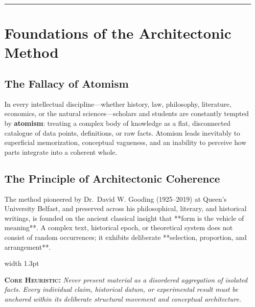 \documentclass[11pt,letterpaper]{article}
\newcommand{\scholion}[2]{%
  \par\vspace{0.3em}%
  \noindent\hspace*{0.8em}%
  {\color{#1}\vrule width 1.3pt}\hspace{0.7em}%
  \parbox{\dimexpr\linewidth-2.2em}{#2}%
  \par\vspace{0.3em}%
}
\newcommand{\heuristicrule}[1]{\scholion{myrtleWine}{\small\color{myrtleDark}\textbf{\textsc{Core Heuristic:}} \itshape #1}}
\begin{document}
\vspace{0.6em}
\noindent\rule{\linewidth}{0.4pt}
\vspace{1.2em}

\section{Foundations of the Architectonic Method}

\subsection{The Fallacy of Atomism}
In every intellectual discipline---whether history, law, philosophy, literature, economics, or the natural sciences---scholars and students are constantly tempted by \textbf{atomism}: treating a complex body of knowledge as a flat, disconnected catalogue of data points, definitions, or raw facts. Atomism leads inevitably to superficial memorization, conceptual vagueness, and an inability to perceive how parts integrate into a coherent whole.

\subsection{The Principle of Architectonic Coherence}
The method pioneered by Dr.~David W. Gooding (1925--2019) at Queen's University Belfast, and preserved across his philosophical, literary, and historical writings, is founded on the ancient classical insight that **form is the vehicle of meaning**. A complex text, historical epoch, or theoretical system does not consist of random occurrences; it exhibits deliberate **selection, proportion, and arrangement**.

\heuristicrule{Never present material as a disordered aggregation of isolated facts. Every individual claim, historical datum, or experimental result must be anchored within its deliberate structural movement and conceptual architecture.}
\end{document}
